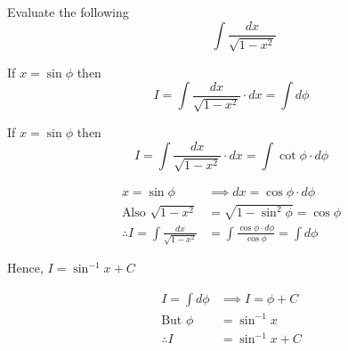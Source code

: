 \documentclass[14pt,fleqn]{extarticle}
\begin{document}
Evaluate the following \[ \qquad \int \frac{dx}{\sqrt{1-x^2}} \]
%

\newcard

If $x = \sin\phi$ then 
\[ I = \int \frac{dx}{\sqrt{1-x^2}}\cdot dx = \int d\phi\]

\newcard  

If $x = \sin\phi$ then 
\[ I = \int \frac{dx}{\sqrt{1-x^2}}\cdot dx = \int \cot\phi\cdot d\phi \]

\newcard 

\begin{align}
	x = \sin\phi &\implies dx = \cos\phi\cdot d\phi \\
	\text{Also } \sqrt{1-x^2} &= \sqrt{1-\sin^2\phi} = \cos \phi \\
	\therefore I = \int \frac{dx}{\sqrt{1-x^2}} &= \int \frac{\cos\phi\cdot d\phi}{\cos\phi} = \int d\phi
\end{align}

\newcard 

Hence, $I = \sin^{-1}x + C$ 

\newcard 

\begin{align}
	I = \int d\phi &\implies I = \phi + C \\
	\text{But } \phi &= \sin^{-1} x \\
	\therefore I &= \sin^{-1} x + C 
\end{align}
\end{document}
